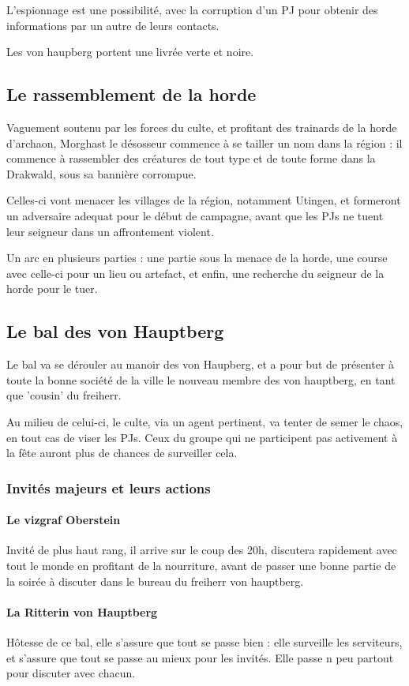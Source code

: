 \documentclass[10pt,a4paper]{book}
\begin{document}
L'espionnage est une possibilité, avec la corruption d'un PJ pour obtenir des informations par un autre de leurs contacts.

Les von haupberg portent une livrée verte et noire.

\subsection{Le rassemblement de la horde}
Vaguement soutenu par les forces du culte, et profitant des trainards de la horde d'archaon, Morghast le désosseur commence à se tailler un nom dans la région : il commence à rassembler des créatures de tout type et de toute forme dans la Drakwald, sous sa bannière corrompue.

Celles-ci vont menacer les villages de la région, notamment Utingen, et formeront un adversaire adequat pour le début de campagne, avant que les PJs ne tuent leur seigneur dans un affrontement violent. 

Un arc en plusieurs parties : une partie sous la menace de la horde, une course avec celle-ci pour un lieu ou artefact, et enfin, une recherche du seigneur de la horde pour le tuer.

\subsection{Le bal des von Hauptberg}
Le bal va se dérouler au manoir des von Haupberg, et a pour but de présenter à toute la bonne société de la ville le nouveau membre des von hauptberg, en tant que 'cousin' du freiherr. 

Au milieu de celui-ci, le culte, via un agent pertinent, va tenter de semer le chaos, en tout cas de viser les PJs. Ceux du groupe qui ne participent pas activement à la fête auront plus de chances de surveiller cela.

\subsubsection{Invités majeurs et leurs actions}
\paragraph{Le vizgraf Oberstein} Invité de plus haut rang, il arrive sur le coup des 20h, discutera rapidement avec tout le monde en profitant de la nourriture, avant de passer une bonne partie de la soirée à discuter dans le bureau du freiherr von hauptberg.
\paragraph{La Ritterin von Hauptberg}Hôtesse de ce bal, elle s'assure que tout se passe bien : elle surveille les serviteurs, et s'assure que tout se passe au mieux pour les invités. Elle passe n peu partout pour discuter avec chacun.
\end{document}
